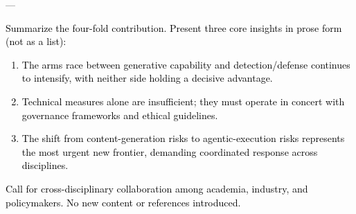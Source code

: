 ––\documentclass[preprint,12pt]{elsarticle}
\newcommand{\outline}[1]{\textcolor{black}{#1}}
\begin{document}
\outline{%
Summarize the four-fold contribution. Present three core insights in prose form (not as a list):
\begin{enumerate}[nosep,leftmargin=1.5em]
    \item The arms race between generative capability and detection/defense continues to intensify, with neither side holding a decisive advantage.
    \item Technical measures alone are insufficient; they must operate in concert with governance frameworks and ethical guidelines.
    \item The shift from content-generation risks to agentic-execution risks represents the most urgent new frontier, demanding coordinated response across disciplines.
\end{enumerate}
Call for cross-disciplinary collaboration among academia, industry, and policymakers. No new content or references introduced.
}




\end{document}
